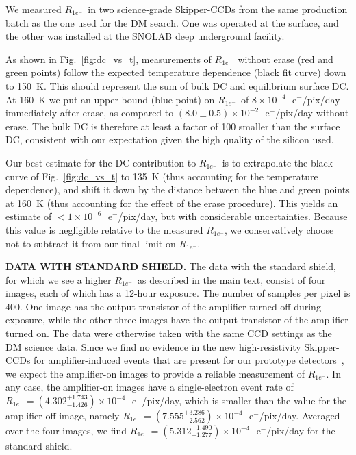 \documentclass[aps,prl,twocolumn,showpacs,superscriptaddress,preprintnumbers]{revtex4-1}
\newcommand{\unit}[1]{\ensuremath{\mathrm{\,#1}}\xspace}
\newcommand{\e}{\unit{e^{-}}}
\newcommand{\Rs}{$R_{1e^-}$}
\begin{document}
We measured \Rs\ in two science-grade Skipper-CCDs from the same production batch as the one used for the DM search. One was operated at the surface, and the other was installed at the SNOLAB deep underground facility.

As shown in Fig.~\ref{fig:dc_vs_t}, measurements of \Rs\ without erase (red and green points) follow the expected temperature dependence (black fit curve) down to 150~K.
This should represent the sum of bulk DC and equilibrium surface DC.
At 160~K we put an upper bound (blue point) on \Rs\ of $8 \times 10^{-4}$~\e/pix/day immediately after erase, as compared to $(8.0\pm 0.5)\times 10^{-2}$~\e/pix/day without erase. The bulk DC is therefore at least a factor of 100 smaller than the surface DC, consistent with our expectation given the high quality of the silicon used.

Our best estimate for the DC contribution to \Rs\ is to extrapolate the black curve of Fig.~\ref{fig:dc_vs_t} to 135~K (thus accounting for the temperature dependence), and shift it down by the distance between the blue and green points at 160~K (thus accounting for the effect of the erase procedure). This yields an estimate of $<1\times 10^{-6}$~\e/pix/day, but with considerable uncertainties. Because this value is negligible relative to the measured \Rs, we conservatively choose not to subtract it from our final limit on \Rs.




\vskip 3mm
\noindent \textbf{DATA WITH STANDARD SHIELD.}
The data with the standard shield, for which we see a higher \Rs\ as described in the main text, consist of four images, each of which has a 12-hour exposure.  The number of samples per pixel is 400.  One image has the output transistor of the amplifier turned off during exposure, while the other three images have the output transistor of the amplifier turned on. The data were otherwise taken with the same CCD settings as the DM science data. Since we find no evidence in the new high-resistivity Skipper-CCDs for amplifier-induced events that are present for our prototype detectors~\cite{Abramoff:2019dfb}, we expect the amplifier-on images to provide a reliable measurement of \Rs.  In any case, the amplifier-on images have a single-electron event rate of $R_{1e^-}=(4.302^{+1.743}_{-1.426})\times 10^{-4}$~\e/pix/day, which is smaller than the value for the amplifier-off image, namely $R_{1e^-}=(7.555^{+3.286}_{-2.562})\times 10^{-4}$~\e/pix/day. 
Averaged over the four images, we find $R_{1e^-}=(5.312^{+1.490}_{-1.277})\times 10^{-4}$~\e/pix/day for the standard shield. 
\end{document}
